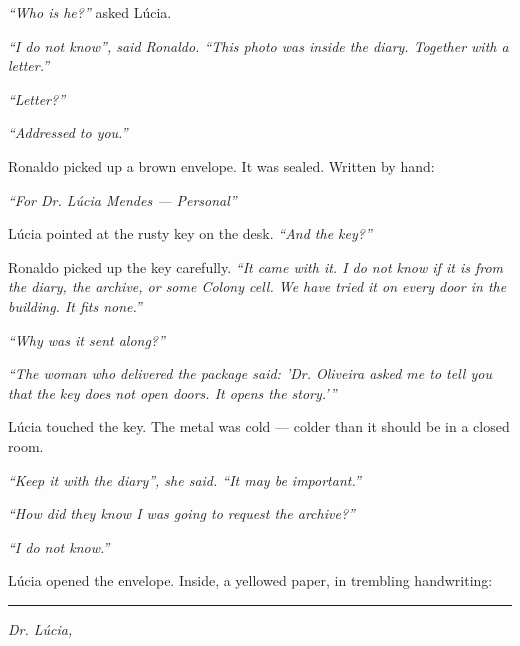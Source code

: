\noindent \textit{\textquotedblleft{}Who is he?\textquotedblright{}} asked Lúcia.

\noindent \textit{\textquotedblleft{}I do not know\textquotedblright{}\textit{, said Ronaldo. }\textquotedblleft{}This photo was inside the diary. Together with a letter.\textquotedblright{}}

\noindent \textit{\textquotedblleft{}Letter?\textquotedblright{}}

\noindent \textit{\textquotedblleft{}Addressed to you.\textquotedblright{}}

\noindent Ronaldo picked up a brown envelope. It was sealed. Written by hand:

\noindent \textit{\textquotedblleft{}For Dr. Lúcia Mendes --- Personal\textquotedblright{}}

\noindent Lúcia pointed at the rusty key on the desk. \textit{\textquotedblleft{}And the key?\textquotedblright{}}

\noindent Ronaldo picked up the key carefully. \textit{\textquotedblleft{}It came with it. I do not know if it is from the diary, the archive, or some Colony cell. We have tried it on every door in the building. It fits none.\textquotedblright{}}

\noindent \textit{\textquotedblleft{}Why was it sent along?\textquotedblright{}}

\noindent \textit{\textquotedblleft{}The woman who delivered the package said: 'Dr. Oliveira asked me to tell you that the key does not open doors. It opens the story.'\textquotedblright{}}

\noindent Lúcia touched the key. The metal was cold --- colder than it should be in a closed room.

\noindent \textit{\textquotedblleft{}Keep it with the diary\textquotedblright{}\textit{, she said. }\textquotedblleft{}It may be important.\textquotedblright{}}

\noindent \textit{\textquotedblleft{}How did they know I was going to request the archive?\textquotedblright{}}

\noindent \textit{\textquotedblleft{}I do not know.\textquotedblright{}}

\noindent Lúcia opened the envelope. Inside, a yellowed paper, in trembling handwriting:

\vspace{0.5em}\noindent\rule{\textwidth}{0.5pt}\vspace{0.5em}

\noindent \textit{Dr. Lúcia,}

